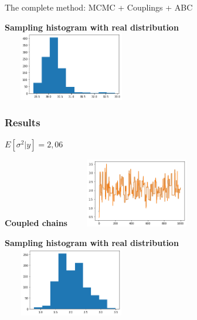 \documentclass{beamer}
\begin{document}
\begin{section}{The complete method: MCMC + Couplings + ABC}
\begin{frame}
\begin{center}
		\vspace{0.2cm}
		
		\begin{minipage}{0.63\textwidth}
			\begin{center}
				{\scriptsize \textbf{Sampling histogram with real distribution}}
				\includegraphics[width=6cm,height=3cm]{immagini_mario/mu_hist}
			\end{center}
		\end{minipage}
	\end{center}
\end{frame}

\begin{frame}
	\frametitle{Results}
	$ E[\sigma^2|y]=2,06 $
	\begin{center}
		\begin{minipage}{0.63\textwidth}
			\begin{center}
				{\scriptsize \textbf{Coupled chains}}
				\includegraphics[width=6cm,height=3cm]{immagini_mario/sigma_chains}
			\end{center}
		\end{minipage}
		
		\vspace{0.2cm}
		
		\begin{minipage}{0.63\textwidth}
			\begin{center}
				{\scriptsize \textbf{Sampling histogram with real distribution}}
				\includegraphics[width=6cm,height=3cm]{immagini_mario/sigma_hist}
			\end{center}
		\end{minipage}
	\end{center}
\end{frame}

\end{section}
\end{document}
